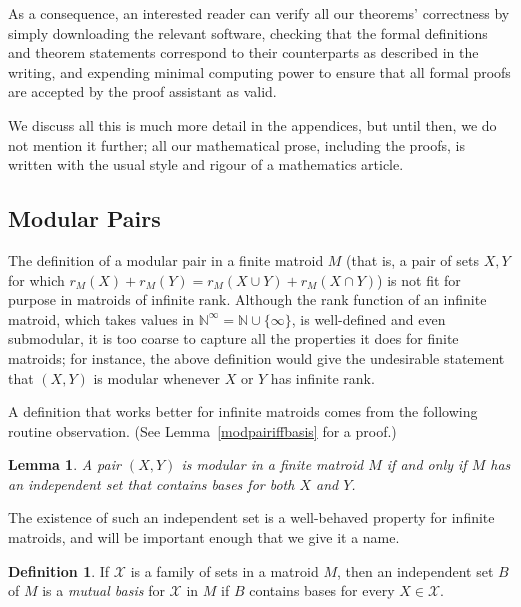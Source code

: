 \documentclass{amsart}
\theoremstyle{plain}
\newtheorem{lemma}[theorem]{Lemma}
\newcounter{defn}
\theoremstyle{definition}
\newtheorem{definition}[defn]{Definition}
\newcommand{\bN}{\mathbb N}
\newcommand{\cX}{\mathcal{X}}
\newcommand{\enn}{\mathbb{N}^{\infty}}
\begin{document}
As a consequence, an interested reader can verify all our theorems' correctness by 
simply downloading the relevant software, checking that the formal definitions
and theorem statements correspond to their counterparts as described in the writing, 
and expending minimal computing power to ensure that all formal proofs
are accepted by the proof assistant as valid. 

We discuss all this is much more detail in the appendices,
but until then, we do not mention it further; 
all our mathematical prose, including the proofs, 
is written with the usual style and rigour of a mathematics article.

\subsection*{Modular Pairs}

The definition of a modular pair in a finite matroid $M$ 
(that is, a pair of sets $X,Y$ for which $r_M(X) + r_M(Y) = r_M(X \cup Y) + r_M(X \cap Y)$)
is not fit for purpose in matroids of infinite rank.
Although the rank function of an infinite matroid, 
which takes values in $\enn = \bN \cup \{\infty\}$, is well-defined and even submodular, 
it is too coarse to capture all the properties it does for finite matroids;
for instance, the above definition would give the undesirable statement that $(X,Y)$ is modular whenever $X$ or $Y$ has infinite rank. 

A definition that works better for infinite matroids comes from the following routine observation. (See Lemma~\ref{modpairiffbasis} for a proof.)

\begin{lemma}\label{modpairiffbasisintro}
  A pair $(X,Y)$ is modular in a finite matroid $M$ if 
  and only if $M$ has an independent set that contains bases for both $X$ and $Y$. 
\end{lemma}

The existence of such an independent set is a well-behaved property for infinite matroids, 
and will be important enough that we give it a name. 

\begin{definition}
  If $\cX$ is a family of sets in a matroid $M$, then an independent set $B$ of $M$ is a \emph{mutual basis}
  for $\cX$ in $M$ if $B$ contains bases for every $X \in \cX$. 
\end{definition}
\end{document}
